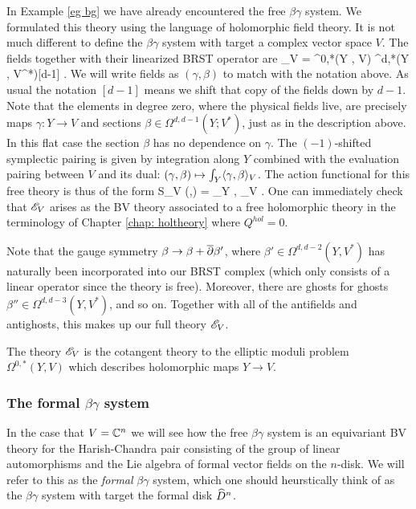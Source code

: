 In Example \ref{eg bg} we have already encountered the free $\beta\gamma$ system.
We formulated this theory using the language of holomorphic field theory.
It is not much different to define the $\beta\gamma$ system with target a complex vector space $V$. 
The fields together with their linearized BRST operator are
\ben
\sE_V = \Omega^{0,*}(Y , V) \oplus \Omega^{d,*}(Y , V^*)[d-1] .
\een
We will write fields as $(\gamma,\beta)$ to match with the notation above.
As usual the notation $[d-1]$ means we shift that copy of the fields down by $d-1$. 
Note that the elements in degree zero, where the physical fields live, are precisely maps $\gamma : Y \to V$ and sections $\beta \in\Omega^{d,d-1} (Y ; V^*)$, just as in the description above. 
In this flat case the section $\beta$ has no dependence on $\gamma$.
The $(-1)$-shifted symplectic pairing is given by integration along $Y$ combined with the evaluation pairing between $V$ and its dual: $(\gamma, \beta) \mapsto \int_Y \langle\gamma, \beta\rangle_V$. 
The action functional for this free theory is thus of the form
\ben
S_V (\beta,\gamma) = \int_Y \<\beta, \dbar \gamma\>_{V} .
\een
One can immediately check that $\mathscr E_V$ arises as the BV theory associated to a free holomorphic theory in the terminology of Chapter \ref{chap: holtheory} where $Q^{hol} = 0$. 

Note that the gauge symmetry $\beta \to \beta + \overline{\partial} \beta'$, where $\beta' \in \Omega^{d,d-2} (Y, V^*)$ has naturally been incorporated into our BRST complex (which only consists of a linear operator since the theory is free). 
Moreover, there are ghosts for ghosts $\beta'' \in \Omega^{d,d-3}(Y , V^*)$, and so on.
Together with all of the antifields and antighosts, this makes up our full theory $\mathscr E_V$. 

The theory $\mathscr E_V$ is the cotangent theory to the elliptic moduli problem $\Omega^{0,*}(Y, V)$ which describes holomorphic maps $Y \to V$.

\subsubsection{The formal $\beta\gamma$ system}

In the case that $V = \mathbb C^n$ we will see how the free $\beta\gamma$ system is an equivariant BV theory for the Harish-Chandra pair consisting of the group of linear automorphisms and the Lie algebra of formal vector fields on the $n$-disk.
We will refer to this as the {\em formal} $\beta\gamma$ system, which one should heurstically think of as the $\beta\gamma$ system with target the formal disk $\widehat{D}^n$.

